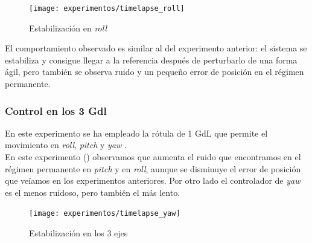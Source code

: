 \begin{figure}[htb!]
	\centering
	\texttt{[image: experimentos/timelapse\_roll]}
	\caption{Estabilización en \textit{roll}}
	\label{tl_pr}	
\end{figure}

El comportamiento observado es similar al del experimento anterior: el sistema se estabiliza y consigue llegar a la referencia después de perturbarlo de una forma ágil, pero también se observa ruido y un pequeño error de posición en el régimen permanente.

\subsubsection{Control en los 3 Gdl}

En este experimento se ha empleado la rótula de 1 GdL que permite el movimiento en \textit{roll}, \textit{pitch} y \textit{yaw} .
\\

En este experimento () observamos que aumenta el ruido que encontramos en el régimen permanente en \textit{pitch} y en \textit{roll}, aunque se disminuye el error de posición que veíamos en los experimentos anteriores. Por otro lado el controlador de \textit{yaw} es el menos ruidoso, pero también el más lento.

\begin{figure}[htb!]
	\centering
	\texttt{[image: experimentos/timelapse\_yaw]}
	\caption{Estabilización en los 3 ejes}
	\label{tl_pr}	
\end{figure}


